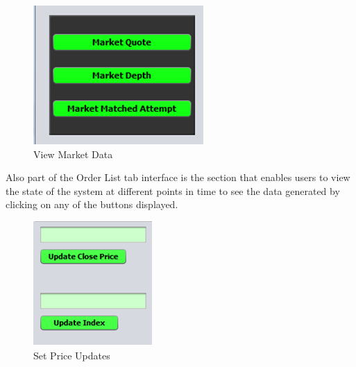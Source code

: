 \documentclass[12pt]{article}
\begin{document}
\begin{figure}[h!]
\centering
\includegraphics[scale=0.8]{./marketdata}
\caption{View Market Data}
\label{Market Data}
\end{figure}
Also part of the Order List tab interface is the section that enables users to view the state of the system at different points in time to see the data generated by clicking on any of the buttons displayed.
\pagebreak            
\begin{figure}[h!]
\centering
\includegraphics[scale=0.8]{./priceupdates}
\caption{Set Price Updates}
\label{Price Updates}
\end{figure}
\end{document}
